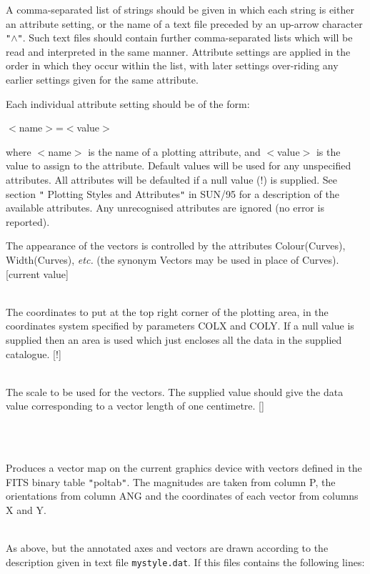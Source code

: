 \documentclass[twoside,11pt]{article}
\newcommand{\xref}[3]{#1}
\renewcommand{\_}{\texttt{\symbol{95}}}
\newlength{\sstexampleslength}
\newcommand{\sstexamples}[1]{
   \item[Examples:] \mbox{} \\
   \vspace{-3.5ex}
   \begin{description}
      #1
   \end{description}
}
\newcommand{\sstsubsection}[1]{ \item[{#1}] \mbox{} \\}
\newcommand{\sstexamplesubsection}[2]{\sloppy
\item[\parbox{\sstexampleslength}{\ssttt #1}] \mbox{} \vspace{1.0ex}
\\ #2 }
\newcommand{\sstexamples}[1]{
      \item[Examples:] \\
      \begin{description}
         #1
      \end{description}
      \\
   }
\newcommand{\sstsubsection}[1]{\item[{#1}]}
\newcommand{\sstexamplesubsection}[2]{\item[{\ssttt #1}] #2}
\begin{document}
{{{         A comma-separated list of strings should be given in which each
         string is either an attribute setting, or the name of a text file
         preceded by an up-arrow character {\tt "}$\wedge${\tt "}. Such text files should
         contain further comma-separated lists which will be read and
         interpreted in the same manner. Attribute settings are applied in
         the order in which they occur within the list, with later settings
         over-riding any earlier settings given for the same attribute.

         Each individual attribute setting should be of the form:

            $<$name$>$=$<$value$>$

         where $<$name$>$ is the name of a plotting attribute, and $<$value$>$ is
         the value to assign to the attribute. Default values will be
         used for any unspecified attributes. All attributes will be
         defaulted if a null value (!) is supplied. See section {\tt "}
         \xref{Plotting Styles and Attributes}{sun95}{se_style}{\tt "} in 
         \xref{SUN/95}{sun95}{} for a description of the available
         attributes. Any unrecognised attributes are ignored (no error is
         reported).

         The appearance of the vectors is controlled by the attributes
         Colour(Curves), Width(Curves), \emph{etc.} (the synonym Vectors may be
         used in place of Curves). [current value]
      }
      \sstsubsection{
         UBND(2) = \_REAL (Read)
      }{
         The coordinates to put at the top right corner of the plotting
         area, in the coordinates system specified by parameters COLX and
         COLY. If a null value is supplied then an area is used which just
         encloses all the data in the supplied catalogue. [!]
      }
      \sstsubsection{
         VSCALE = \_REAL (Read)
      }{
         The scale to be used for the vectors.  The supplied value
         should give the data value corresponding to a vector length of
         one centimetre.  []
      }
   }
   \sstexamples{
      \sstexamplesubsection{
         polplot poltab
      }{
         Produces a vector map on the current graphics device with
         vectors defined in the FITS binary table {\tt "}poltab{\tt "}. The magnitudes
         are taken from column P, the orientations from column ANG and
         the coordinates of each vector from columns X and Y.
      }
      \sstexamplesubsection{
         polplot poltab style=$\wedge$mystyle.dat
      }{
         As above, but the annotated axes and vectors are drawn according
         to the description given in text file \texttt{mystyle.dat}. If this
         files contains the following lines:

}}}
\end{document}
